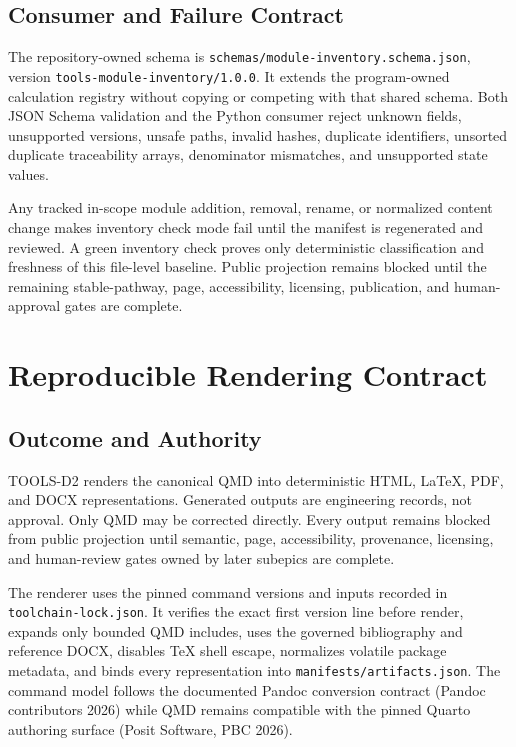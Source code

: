 \documentclass[
  american,
]{article}
\begin{document}
\subsection{Consumer and Failure
Contract}\label{consumer-and-failure-contract}

The repository-owned schema is
\texttt{schemas/module-inventory.schema.json}, version
\texttt{tools-module-inventory/1.0.0}. It extends the program-owned
calculation registry without copying or competing with that shared
schema. Both JSON Schema validation and the Python consumer reject
unknown fields, unsupported versions, unsafe paths, invalid hashes,
duplicate identifiers, unsorted duplicate traceability arrays,
denominator mismatches, and unsupported state values.

Any tracked in-scope module addition, removal, rename, or normalized
content change makes inventory check mode fail until the manifest is
regenerated and reviewed. A green inventory check proves only
deterministic classification and freshness of this file-level baseline.
Public projection remains blocked until the remaining stable-pathway,
page, accessibility, licensing, publication, and human-approval gates
are complete.

\section{Reproducible Rendering
Contract}\label{reproducible-rendering-contract}

\subsection{Outcome and Authority}\label{outcome-and-authority}

TOOLS-D2 renders the canonical QMD into deterministic HTML, LaTeX, PDF,
and DOCX representations. Generated outputs are engineering records, not
approval. Only QMD may be corrected directly. Every output remains
blocked from public projection until semantic, page, accessibility,
provenance, licensing, and human-review gates owned by later subepics
are complete.

The renderer uses the pinned command versions and inputs recorded in
\texttt{toolchain-lock.json}. It verifies the exact first version line
before render, expands only bounded QMD includes, uses the governed
bibliography and reference DOCX, disables TeX shell escape, normalizes
volatile package metadata, and binds every representation into
\texttt{manifests/artifacts.json}. The command model follows the
documented Pandoc conversion contract (Pandoc contributors 2026) while
QMD remains compatible with the pinned Quarto authoring surface (Posit
Software, PBC 2026).
\end{document}

